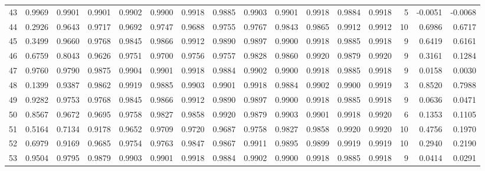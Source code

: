 \begin{tabular}{lrrrrrrrrrrrrrrr}
43  &      0.9969 &  0.9901 &  0.9901 &  0.9902 &  0.9900 &  0.9918 &  0.9885 &  0.9903 &  0.9901 &  0.9918 &   0.9884 &     0.9918 &      5 &                   -0.0051 &                    -0.0068 \\
44  &      0.2926 &  0.9643 &  0.9717 &  0.9692 &  0.9747 &  0.9688 &  0.9755 &  0.9767 &  0.9843 &  0.9865 &   0.9912 &     0.9912 &     10 &                    0.6986 &                     0.6717 \\
45  &      0.3499 &  0.9660 &  0.9768 &  0.9845 &  0.9866 &  0.9912 &  0.9890 &  0.9897 &  0.9900 &  0.9918 &   0.9885 &     0.9918 &      9 &                    0.6419 &                     0.6161 \\
46  &      0.6759 &  0.8043 &  0.9626 &  0.9751 &  0.9700 &  0.9756 &  0.9757 &  0.9828 &  0.9860 &  0.9920 &   0.9879 &     0.9920 &      9 &                    0.3161 &                     0.1284 \\
47  &      0.9760 &  0.9790 &  0.9875 &  0.9904 &  0.9901 &  0.9918 &  0.9884 &  0.9902 &  0.9900 &  0.9918 &   0.9885 &     0.9918 &      9 &                    0.0158 &                     0.0030 \\
48  &      0.1399 &  0.9387 &  0.9862 &  0.9919 &  0.9885 &  0.9903 &  0.9901 &  0.9918 &  0.9884 &  0.9902 &   0.9900 &     0.9919 &      3 &                    0.8520 &                     0.7988 \\
49  &      0.9282 &  0.9753 &  0.9768 &  0.9845 &  0.9866 &  0.9912 &  0.9890 &  0.9897 &  0.9900 &  0.9918 &   0.9885 &     0.9918 &      9 &                    0.0636 &                     0.0471 \\
50  &      0.8567 &  0.9672 &  0.9695 &  0.9758 &  0.9827 &  0.9858 &  0.9920 &  0.9879 &  0.9903 &  0.9901 &   0.9918 &     0.9920 &      6 &                    0.1353 &                     0.1105 \\
51  &      0.5164 &  0.7134 &  0.9178 &  0.9652 &  0.9709 &  0.9720 &  0.9687 &  0.9758 &  0.9827 &  0.9858 &   0.9920 &     0.9920 &     10 &                    0.4756 &                     0.1970 \\
52  &      0.6979 &  0.9169 &  0.9685 &  0.9754 &  0.9763 &  0.9847 &  0.9867 &  0.9911 &  0.9895 &  0.9899 &   0.9919 &     0.9919 &     10 &                    0.2940 &                     0.2190 \\
53  &      0.9504 &  0.9795 &  0.9879 &  0.9903 &  0.9901 &  0.9918 &  0.9884 &  0.9902 &  0.9900 &  0.9918 &   0.9885 &     0.9918 &      9 &                    0.0414 &                     0.0291 \\

\end{tabular}
